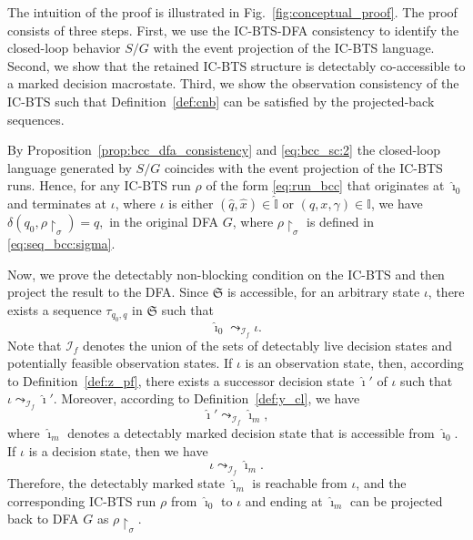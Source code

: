 \documentclass[twocolumn]{autart}
\begin{document}
\begin{pf}
The intuition of the proof is illustrated in Fig.~\ref{fig:conceptual_proof}. The proof consists of three steps.
First, we use the IC-BTS-DFA consistency to identify the closed-loop behavior $S/G$ with the event projection of the IC-BTS language.
Second, we show that the retained IC-BTS structure is detectably co-accessible to a marked decision macrostate.
Third, we show the observation consistency of the IC-BTS such that Definition~\ref{def:cnb} can be satisfied by the projected-back sequences.


By Proposition~\ref{prop:bcc_dfa_consistency} and \eqref{eq:bcc_sc:2} the closed-loop language generated by $S / G$ coincides with the event projection of the IC-BTS runs.
%
%
Hence, for any IC-BTS run $\rho$ of the form \eqref{eq:run_bcc} that originates at $\hat{\imath}_0$ and terminates at $\iota$, where $\iota$ is either $(\hat{q}, \hat{x}) \in \hat{\mathbb{I}}$ or $(q, x, \gamma) \in \mathbb{I}$, we have
$
    \delta(q_0, \rho\restriction_\sigma) = q,
$
in the original DFA $G$, where $\rho\restriction_\sigma$ is defined in \eqref{eq:seq_bcc:sigma}.


%
Now, we prove the detectably non-blocking condition on the IC-BTS and then project the result to the DFA.
%
Since $\mathfrak{S}$ is accessible, for an arbitrary state $\iota$, there exists a sequence $\tau_{q_0, q}$ in $\mathfrak{S}$ such that
$$
\hat{\imath}_0 \leadsto_{\mathcal{I}_f} \iota.
$$
Note that $\mathcal{I}_f$ denotes the union of the sets of detectably live decision states and potentially feasible observation states.
%
If $\iota$ is an observation state, then, according to Definition~\ref{def:z_pf}, there exists a successor decision state $\hat{\imath}'$ of $\iota$ such that
$
\iota \leadsto_{\mathcal{I}_f} \hat{\imath}'.
$
Moreover, according to Definition~\ref{def:y_cl}, we have
$$
\hat{\imath}' \leadsto_{\mathcal{I}_f} \hat{\imath}_m,
$$
where $\hat{\imath}_m$ denotes a detectably marked decision state that is accessible from $\hat{\imath}_0$.
%
If $\iota$ is a decision state, then we have
$$
\iota \leadsto_{\mathcal{I}_f} \hat{\imath}_m.
$$
Therefore, the detectably marked state $\hat{\imath}_m$ is reachable from $\iota$, and
the corresponding IC-BTS run $\rho$ from $\hat{\imath}_0$ to $\iota$ and ending at $\hat{\imath}_m$ can be projected back to DFA $G$ as $\rho\restriction_{\sigma}$.


\end{pf}
\end{document}
